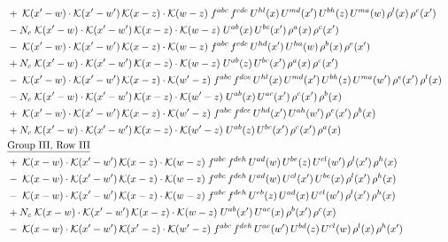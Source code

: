 \documentclass[9pt]{article}
\begin{document}
\begin{align}
&\quad +\;\mathcal{K}(x'-w)\cdot\mathcal{K}(x'-w')\,\mathcal{K}(x-z)\cdot\mathcal{K}(w-z)\;f^{abc}\,f^{cde}\,U^{hl}(x)\,U^{md}(x')\,U^{bh}(z)\,U^{ma}(w)\,\rho^{l}(x)\,\rho^{e}(x')\notag\\
&\quad -N_c\;\mathcal{K}(x'-w)\cdot\mathcal{K}(x'-w')\,\mathcal{K}(x-z)\cdot\mathcal{K}(w-z)\;U^{ab}(x)\,U^{bc}(x')\,\rho^{a}(x)\,\rho^{c}(x')\notag\\
&\quad -\;\mathcal{K}(x'-w)\cdot\mathcal{K}(x'-w')\,\mathcal{K}(x-z)\cdot\mathcal{K}(w-z)\;f^{abc}\,f^{cde}\,U^{hd}(x')\,U^{ha}(w)\,\rho^{b}(x)\,\rho^{e}(x')\notag\\
&\quad +N_c\;\mathcal{K}(x'-w)\cdot\mathcal{K}(x'-w')\,\mathcal{K}(x-z)\cdot\mathcal{K}(w-z)\;U^{ab}(z)\,U^{bc}(x')\,\rho^{a}(x)\,\rho^{c}(x')\notag\\
&\quad -\;\mathcal{K}(x'-w)\cdot\mathcal{K}(x'-w')\,\mathcal{K}(x-z)\cdot\mathcal{K}(w'-z)\;f^{abc}\,f^{dce}\,U^{hl}(x)\,U^{md}(x')\,U^{bh}(z)\,U^{ma}(w')\,\rho^{e}(x')\,\rho^{l}(x)\notag\\
&\quad -N_c\;\mathcal{K}(x'-w)\cdot\mathcal{K}(x'-w')\,\mathcal{K}(x-z)\cdot\mathcal{K}(w'-z)\;U^{ab}(x)\,U^{ac}(x')\,\rho^{c}(x')\,\rho^{b}(x)\notag\\
&\quad +\;\mathcal{K}(x'-w)\cdot\mathcal{K}(x'-w')\,\mathcal{K}(x-z)\cdot\mathcal{K}(w'-z)\;f^{abc}\,f^{dce}\,U^{hd}(x')\,U^{ah}(w')\,\rho^{e}(x')\,\rho^{b}(x)\notag\\
&\quad +N_c\;\mathcal{K}(x'-w)\cdot\mathcal{K}(x'-w')\,\mathcal{K}(x-z)\cdot\mathcal{K}(w'-z)\;U^{ab}(z)\,U^{bc}(x')\,\rho^{c}(x')\,\rho^{a}(x)\notag\\
&\quad\underline{\text{Group III, Row III}}\notag\\
&\quad +\;\mathcal{K}(x-w)\cdot\mathcal{K}(x'-w')\,\mathcal{K}(x-z)\cdot\mathcal{K}(w-z)\;f^{abc}\,f^{deh}\,U^{ad}(w)\,U^{be}(z)\,U^{cl}(w')\,\rho^{l}(x')\,\rho^{h}(x)\notag\\
&\quad -\;\mathcal{K}(x-w)\cdot\mathcal{K}(x'-w')\,\mathcal{K}(x-z)\cdot\mathcal{K}(w-z)\;f^{abc}\,f^{deh}\,U^{ad}(w)\,U^{cl}(x')\,U^{be}(x)\,\rho^{l}(x')\,\rho^{h}(x)\notag\\
&\quad -\;\mathcal{K}(x-w)\cdot\mathcal{K}(x'-w')\,\mathcal{K}(x-z)\cdot\mathcal{K}(w-z)\;f^{abc}\,f^{deh}\,U^{eb}(z)\,U^{ad}(x)\,U^{cl}(w')\,\rho^{l}(x')\,\rho^{h}(x)\notag\\
&\quad +N_c\;\mathcal{K}(x-w)\cdot\mathcal{K}(x'-w')\,\mathcal{K}(x-z)\cdot\mathcal{K}(w-z)\;U^{ab}(x')\,U^{ac}(x)\,\rho^{b}(x')\,\rho^{c}(x)\notag\\
&\quad -\;\mathcal{K}(x-w)\cdot\mathcal{K}(x'-w')\,\mathcal{K}(x'-z)\cdot\mathcal{K}(w'-z)\;f^{abc}\,f^{deh}\,U^{ae}(w')\,U^{bd}(z)\,U^{cl}(w)\,\rho^{l}(x)\,\rho^{h}(x')\notag\\

\end{align}
\end{document}

